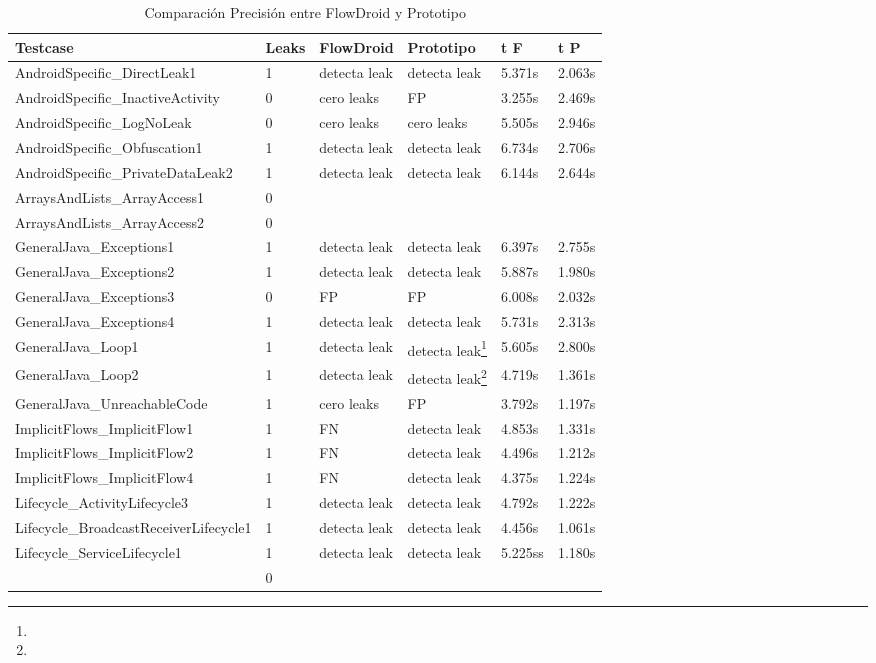 \begin{table}[H]
\small\addtolength{\tabcolsep}{-3pt}
\caption{Comparación Precisión entre FlowDroid y Prototipo}
\label{tb:comparacion}
\begin{tabular}{|p{5.8cm}|p{1cm}|p{2.1cm}|p{2.1cm}|p{1cm}|p{1cm}|}
	\hline
	\textbf{Testcase} & \textbf{Leaks} & \textbf{FlowDroid} &
	\textbf{Prototipo} & \textbf{ t F} & 
	\textbf{t P}\\
	\hline
	AndroidSpecific\_DirectLeak1 & 1 & detecta leak & detecta leak &5.371s &2.063s\\
	\hline
	AndroidSpecific\_InactiveActivity & 0 & cero leaks & FP  &3.255s &2.469s\\
	\hline
	AndroidSpecific\_LogNoLeak & 0 & cero leaks & cero leaks &5.505s &2.946s\\
	\hline
	 AndroidSpecific\_Obfuscation1 & 1 & detecta leak & detecta leak &6.734s
	 &2.706s\\
	\hline
	 AndroidSpecific\_PrivateDataLeak2 & 1 & detecta leak & detecta leak &
	 6.144s &2.644s\\
	\hline
	 ArraysAndLists\_ArrayAccess1 & 0 & & & &\\
	\hline
	 ArraysAndLists\_ArrayAccess2 & 0 & & & &\\
	 \hline
	 GeneralJava\_Exceptions1 & 1 & detecta leak & detecta leak &6.397s &2.755s\\
	\hline
	 GeneralJava\_Exceptions2 & 1 & detecta leak & detecta leak &5.887s &1.980s\\
	\hline
	GeneralJava\_Exceptions3 & 0 & FP & FP &6.008s &2.032s\\
	\hline
	GeneralJava\_Exceptions4 & 1 & detecta leak & detecta leak &5.731s &2.313s\\
	\hline
	GeneralJava\_Loop1 & 1 & detecta leak & detecta leak\footnote{} &5.605s
	&2.800s\\
	\hline
	GeneralJava\_Loop2 & 1 & detecta leak & detecta leak\footnote{} &4.719s
	&1.361s\\
	\hline
	GeneralJava\_UnreachableCode& 1 & cero leaks & FP &3.792s &1.197s\\
	\hline
	ImplicitFlows\_ImplicitFlow1 & 1 & FN & detecta leak &4.853s &1.331s\\
	\hline
	ImplicitFlows\_ImplicitFlow2 & 1 & FN & detecta leak &4.496s &1.212s\\
	\hline
	ImplicitFlows\_ImplicitFlow4 & 1 & FN & detecta leak &4.375s &1.224s\\
	\hline
	Lifecycle\_ActivityLifecycle3 & 1 & detecta leak & detecta leak &4.792s
	&1.222s\\
	\hline
	Lifecycle\_BroadcastReceiverLifecycle1 & 1 & detecta leak & detecta leak
	&4.456s &1.061s\\
	\hline
	Lifecycle\_ServiceLifecycle1 & 1 & detecta leak &detecta leak &5.225ss
	&1.180s\\
	\hline
	& 0 & & & &\\
	\hline
\end{tabular}
\end{table}
